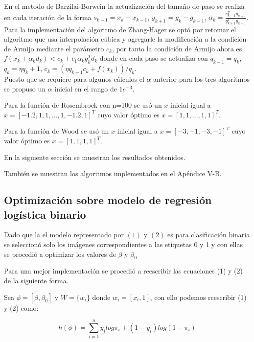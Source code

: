 \documentclass[conference]{IEEEtran}
\begin{document}
En el metodo de Barzilai-Borwein la actualización del tamaño de paso se realiza en cada iteración de
la forma $s_{k-1} = x_k - x_{k-1}$, $y_{k+1} = g_k - g_{k-1}$,
$\alpha_k = \frac{s_{k-1}^T  y_{k+1}}{y_{k+1}^T y_{k+1}}$. \\

Para la implementación del algoritmo de Zhang-Hager se optó por retomar el algoritmo que usa
interpolación cúbica y agregarle la modificación a la condición de Armijo mediante el parámetro
$c_k$, por tanto la condición de Armijo ahora es
$f(x_k + \alpha_k d_k) < c_k + c_1 \alpha_k g_k^T d_k$ donde en cada paso se actualiza con
$q_{k-1} = q_k$, $q_k = \eta  q_k + 1$, $c_k = (\eta  q_{k-1}  c_k + f(x_k)) / q_k$. \\

Puesto que se requiere para algunos cálculos el $\alpha$ anterior para los tres algoritmos se
propuso un $\alpha$ inicial en el rango de $1e^{-3}$.

Para la función de Rosembrock con n=100 se usó un $x$ inicial igual a
$x = [-1.2, 1, 1, ..., 1, -1.2, 1]^T$ cuyo valor óptimo es $x = [1,1,...,1,1]^T$.

Para la función de Wood se usó un $x$ inicial igual a
$x = [-3, -1, -3, -1]^T$ cuyo valor óptimo es $x = [1, 1, 1, 1]^T$.

En la siguiente sección se muestran los resultados obtenidos.

También se muestran los algoritmos implementados en el Apéndice V-B.

\subsection{Optimización sobre modelo de regresión logística binario}

Dado que la el modelo representado por $(1)$ y $(2)$ es para clasificación
binaria se seleccionó solo los imágenes correspondientes a las etiquetas 0 y 1
y con ellas se procedió a optimizar los valores de $\beta$ y $\beta_0$

Para una mejor implementación se procedió a reescribir las ecuaciones (1) y (2)
de la siguiente forma.

Sea $\phi = [\beta, \beta_0]$ y $W = \{w_i\}$ donde $w_i = [x_i, 1]$, con ello
podemos reescribir (1) y (2) como:

\begin{equation}
	h(\phi) = \sum_{i=1}^{n} y_i log\pi_i + (1-y_i)log(1-\pi_i)
\end{equation}
\end{document}
